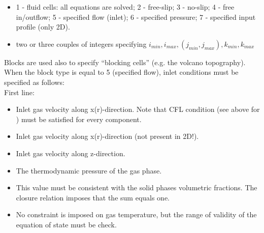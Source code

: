 \begin{itemize}
\item
{}
{1 - fluid cells: all equations are solved; 2 - free-slip;
 3 - no-slip; 4 - free in/outflow; 5 - specified flow (inlet); 
 6 - specified pressure; 7 - specified input profile (only 2D).}

\item
{}
{two or three couples of integers specifying 
$ i_{min}, i_{max}, (j_{min}, j_{max}), k_{min}, k_{max}$ }

\end{itemize}

Blocks are used also to specify ``blocking cells'' (e.g. 
the volcano topography). When the block type is equal to 5 (specified
flow), inlet conditions must be specified as follows:\\

First line:

\begin{itemize}
\item
{}
{Inlet gas velocity along x(r)-direction. Note that CFL condition (see above for ) 
must be satisfied for every component.}

\item
{}
{Inlet gas velocity along x(r)-direction (not present in 2D!).}

\item
{}
{Inlet gas velocity along z-direction.}

\item
{}
{The thermodynamic pressure of the gas phase.}

\item
{}
{This value must be consistent with the solid phases volumetric fractions.
The closure relation imposes that the sum equals one.}

\item
{}
{No constraint is imposed on gas temperature, but the range of validity
of the equation of state must be check.}
\end{itemize}

